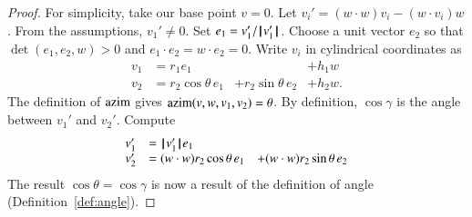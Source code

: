 \begin{proof}  For simplicity,  take our base point $v=0$.
Let $v_i' = (w\cdot w) v_i - (w\cdot v_i) w$.  
From the assumptions, $v_1'\ne 0$.  Set $e_1 = v_1'/{{\hskip0.1em|\hskip-0.15em|\hskip0.1em}v'_1{\hskip0.1em|\hskip-0.15em|\hskip0.1em}}$.  Choose a unit vector
$e_2$ so that $\det(e_1,e_2,w)>0$ and $e_1\cdot e_2 = w\cdot e_2=0$.
Write $v_i$ in cylindrical coordinates as 
   $$
   \begin{array}{lllll}
     v_1 &= r_1 e_1 &    &+h_1 w\\
     v_2 &= r_2 \cos\theta\, e_1 &+ r_2 \sin\theta\, e_2 &+ h_2 w.
    \end{array}
   $$
The definition of ${\operatorname{azim}}$ gives ${\operatorname{azim}}(v,w,v_1,v_2)=\theta$.  
By definition, $\cos\gamma$ is the angle between $v_1'$ and $v_2'$.
Compute
   $$
   \begin{array}{lll}
     v_1' &= {{\hskip0.1em|\hskip-0.15em|\hskip0.1em}v'_1{\hskip0.1em|\hskip-0.15em|\hskip0.1em}} e_1 \\
     v_2' &= (w\cdot w) r_2 \cos\theta\, e_1 
       &+ (w\cdot w) r_2 \sin\theta\, e_2 \\
     \end{array}
   $$
The result $\cos\theta=\cos\gamma$ 
is now a result of the definition of angle 
(Definition~\ref{def:angle}).
\end{proof}





